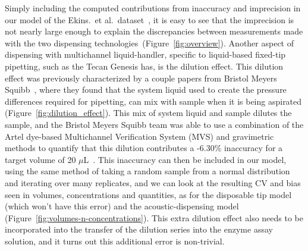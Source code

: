 \documentclass[aps,pre,twocolumn,nofootinbib,superscriptaddress,linenumbers]{revtex4-1}
\begin{document}
Simply including the computed contributions from inaccuracy and imprecision in our model of the  Ekins.~et al.~dataset~\cite{ekins_dispensing_2013}, it is easy to see that the imprecision is not nearly large enough to explain the discrepancies between measurements made with the two dispensing technologies~(Figure~\ref{fig:overview}).
Another aspect of dispensing with multichannel liquid-handler, specific to liquid-based fixed-tip pipetting, such as the Tecan Genesis has, is the dilution effect. 
This dilution effect was previously characterized by a couple papers from Bristol Meyers Squibb~\cite{dong_use_2006,gu_dilution_2007}, where they found that the system liquid used to create the pressure differences required for pipetting, can mix with sample when it is being aspirated (Figure~\ref{fig:dilution_effect}). 
This mix of system liquid and sample dilutes the sample, and the Bristol Meyers Squibb team was able to use a combination of the Artel dye-based Multichannel Verification System (MVS) and gravimetric methods to quantify that this dilution contributes a -6.30\% inaccuracy for a target volume of 20 $\mu$L~\cite{dong_use_2006}.
This inaccuracy can then be included in our model, using the same method of taking a random sample from a normal distribution and iterating over many replicates, and we can look at the resulting CV and bias seen in volumes, concentrations and quantities, as for the disposable tip model (which won't have this error) and the acoustic-dispensing model (Figure~\ref{fig:volumes-n-concentrations}).
This extra dilution effect also needs to be incorporated into the transfer of the dilution series into the enzyme assay solution, and it turns out this additional error is non-trivial.
\end{document}
